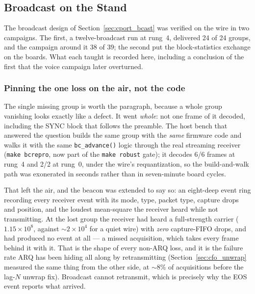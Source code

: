 \subsection{Broadcast on the Stand}
\label{sec:radio_bcast}

The broadcast design of Section~\ref{sec:cport_bcast} was verified on
the wire in two campaigns.  The first, a twelve-broadcast run at
rung~4, delivered 24 of 24 groups, and the campaign around it 38 of
39; the second put the block-statistics exchange on the boards.  What
each taught is recorded here, including a conclusion of the first
that the voice campaign later overturned.

\subsubsection{Pinning the one loss on the air, not the code}

The single missing group is worth the paragraph, because a whole group
vanishing looks exactly like a defect. It went \emph{whole}: not one
frame of it decoded, including the SYNC block that follows the
preamble. The host bench that answered the question builds the same
group with the \emph{same} firmware code and walks it with the same
\texttt{bc\_advance()} logic through the real streaming receiver
(\texttt{make bcrepro}, now part of the \texttt{make robust} gate); it
decodes 6/6 frames at rung~4 and 2/2 at rung~0, under the wire's
requantization, so the build-and-walk path was exonerated in seconds
rather than in seven-minute board cycles.

That left the air, and the beacon was extended to say so: an eight-deep
event ring recording every receiver event with its mode, type, packet
type, capture drops and position, and the loudest mean-square the
receiver heard while not transmitting. At the lost group the receiver
had heard a full-strength carrier ($1.15\times10^{8}$, against
$\sim$$2\times10^{4}$ for a quiet wire) with \emph{zero} capture-FIFO
drops, and had produced no event at all --- a missed acquisition, which
takes every frame behind it with it. That is the shape of every non-ARQ
loss, and it is the failure rate ARQ has been hiding all along by
retransmitting (Section~\ref{sec:cfo_unwrap} measured the same
thing from the other side, at $\sim$8\% of acquisitions before the
lag-$N$ unwrap fix). Broadcast cannot retransmit, which is precisely
why the EOS event reports what arrived.

